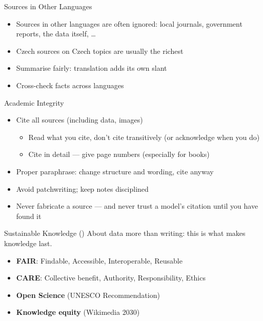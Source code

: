 \documentclass[aspectratio=169]{beamer}
\begin{document}
\begin{frame}{Sources in Other Languages}
\begin{itemize}
  \item Sources in other languages are often ignored: local journals, government reports, the data itself, \ldots
  \item Czech sources on Czech topics are usually the richest
  \item Summarise fairly: translation adds its own slant
  \item Cross-check facts across languages
\end{itemize}
\end{frame}

\begin{frame}{Academic Integrity}
\begin{itemize}
\item Cite all sources (including data, images)
  \begin{itemize}
  \item Read what you cite, don't cite transitively (or acknowledge when you do)
  \item Cite in detail --- give page numbers (especially for books)
  \end{itemize}
  \item Proper paraphrase: change structure and wording, cite anyway
  \item Avoid patchwriting; keep notes disciplined
  \item Never fabricate a source --- and never trust a model's citation
    until you have found it
\end{itemize}
\end{frame}

\begin{frame}{Sustainable Knowledge (\dateFair)}
About data more than writing: this is what makes knowledge last.

\begin{itemize}
  \item \textbf{FAIR}: Findable, Accessible, Interoperable, Reusable \cite{FAIR2016}
  \item \textbf{CARE}: Collective benefit, Authority, Responsibility, Ethics \cite{CARE2020}
  \item \textbf{Open Science} (UNESCO Recommendation) \cite{UNESCOOpenScience2021}
  \item \textbf{Knowledge equity} (Wikimedia 2030) \cite{KnowledgeEquity2030}
\end{itemize}
\end{frame}
\end{document}
